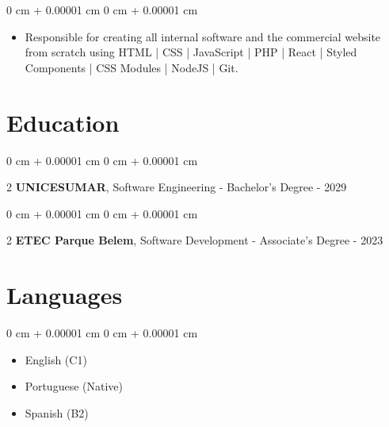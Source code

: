 \documentclass[10pt, letterpaper]{article}
\newenvironment{highlights}{ \begin{itemize}[ topsep=0.10 cm, parsep=0.10 cm, partopsep=0pt,
itemsep=0pt, leftmargin=0 cm + 10pt ] }{ \end{itemize} } %
\newenvironment{onecolentry}{ \begin{adjustwidth}{ 0 cm + 0.00001 cm }{ 0 cm + 0.00001 cm }
}{ \end{adjustwidth} } %
\newenvironment{twocolentry}[2][]{ \onecolentry \def\secondColumn{#2} \setcolumnwidth{\fill, 4.5 cm}
\begin{paracol}{2} }{ \switchcolumn \raggedleft \secondColumn \end{paracol}
\endonecolentry } %
\begin{document}
	\vspace{0.10 cm}
	\begin{onecolentry}
		\begin{highlights}
			\item Responsible for creating all internal software and the commercial website from scratch using HTML | CSS | JavaScript |
            PHP | React | Styled Components | CSS Modules | NodeJS | Git.            
		\end{highlights}
	\end{onecolentry}
	
	\section{Education}
	
	\begin{twocolentry}
		{2025 - 2029} \textbf{UNICESUMAR}, Software Engineering - Bachelor's Degree
	\end{twocolentry}
	
	\begin{twocolentry}
		{2020 -  2023} \textbf{ETEC Parque Belem}, Software Development - Associate's Degree
	\end{twocolentry}
	
	\section{Languages}
	
	\begin{onecolentry}
		\begin{highlights}
			\item English (C1)
			\item Portuguese (Native)
			\item Spanish (B2)
		\end{highlights}
	\end{onecolentry}
	
\end{document}
